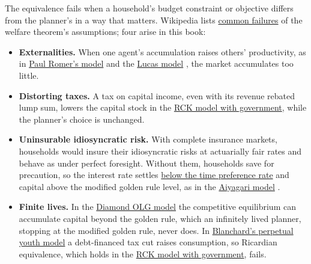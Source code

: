 \documentclass{econark}
\begin{document}
The equivalence fails when a household's budget constraint or objective differs from the planner's in a way that matters. Wikipedia lists \href{https://en.wikipedia.org/wiki/Fundamental_theorems_of_welfare_economics\#Common_failures_of_the_assumptions}{common failures} of the welfare theorem's assumptions; four arise in this book:
\begin{itemize}
\item \textbf{Externalities.} When one agent's accumulation raises others' productivity, as in \href{https://intertemporal-choice.github.io/content/growth/romer86/}{Paul Romer's model} \citep{romer:growth} and the \href{https://intertemporal-choice.github.io/content/growth/lucasgrowth/}{Lucas model} \citep{lucasGrowth}, the market accumulates too little.
\item \textbf{Distorting taxes.} A tax on capital income, even with its revenue rebated lump sum, lowers the capital stock in the \href{https://intertemporal-choice.github.io/content/growth/rckwithgov/}{RCK model with government}, while the planner's choice is unchanged.
\item \textbf{Uninsurable idiosyncratic risk.} With complete insurance markets, households would insure their idiosyncratic risks at actuarially fair rates and behave as under perfect foresight. Without them, households save for precaution, so the interest rate settles \href{https://intertemporal-choice.github.io/content/consumption/aiyagari/\#res-aiyagari-r-below-time-preference}{below the time preference rate} and capital above the modified golden rule level, as in the \href{https://intertemporal-choice.github.io/content/consumption/aiyagari/}{Aiyagari model} \citep{aiyagari:ge}.
\item \textbf{Finite lives.} In the \href{https://intertemporal-choice.github.io/content/consumption/olgmodel/}{Diamond OLG model} \citep{diamond:olg} the competitive equilibrium can accumulate capital beyond the golden rule, which an infinitely lived planner, stopping at the modified golden rule, never does. In \href{https://intertemporal-choice.github.io/content/growth/blanchardfinitehorizon/}{Blanchard's perpetual youth model} \citep{blanchardFinite} a debt-financed tax cut raises consumption, so Ricardian equivalence, which holds in the \href{https://intertemporal-choice.github.io/content/growth/rckwithgov/}{RCK model with government}, fails.
\end{itemize}



\end{document}
